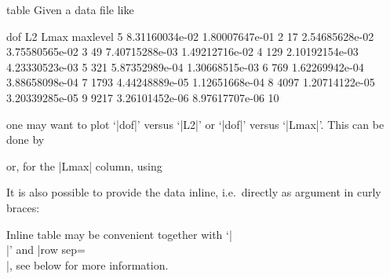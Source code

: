 {\begin{addplotoperation}[]{table}{}
Given a data file like
\begin{codeexample}
dof     L2              Lmax            maxlevel
5       8.31160034e-02  1.80007647e-01  2
17      2.54685628e-02  3.75580565e-02  3
49      7.40715288e-03  1.49212716e-02  4
129     2.10192154e-03  4.23330523e-03  5
321     5.87352989e-04  1.30668515e-03  6
769     1.62269942e-04  3.88658098e-04  7
1793    4.44248889e-05  1.12651668e-04  8
4097    1.20714122e-05  3.20339285e-05  9
9217    3.26101452e-06  8.97617707e-06  10
\end{codeexample}
one may want to plot `|dof|' versus `|L2|' or `|dof|' versus `|Lmax|'. This can be done by
\begin{codeexample}
\end{codeexample}
or, for the |Lmax| column, using
\begin{codeexample}
\end{codeexample}
It is also possible to provide the data inline, i.e.\ directly as argument in curly braces:
\begin{codeexample}
\end{codeexample}
\noindent Inline table may be convenient together with `|\\|' and |row sep=\\|, see below for more information.


\end{addplotoperation}}
